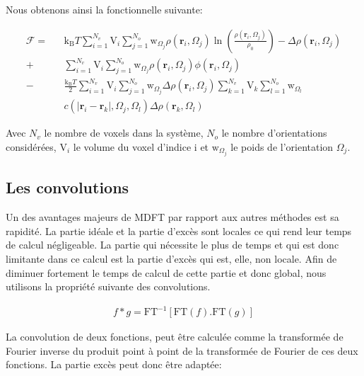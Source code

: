 Nous obtenons ainsi la fonctionnelle suivante:



\begin{eqnarray}
\mathcal{F} =& &\mathrm{k_B}T \sum\limits_{i=1}^{N_v}\mathrm{V}_i\sum\limits_{j=1}^{N_o}\mathrm{w}_{\Omega_j} \rho\left(\boldsymbol{r}_i,\Omega_j\right)\ln\left(\frac{\rho\left(\boldsymbol{r}_i,\Omega_j\right)}{\rho_0}\right)-\Delta\rho\left(\boldsymbol{r}_i,\Omega_j\right)\\
			+& &\sum\limits_{i=1}^{N_v}\mathrm{V}_i\sum\limits_{j=1}^{N_o}\mathrm{w}_{\Omega_j} \rho\left(\boldsymbol{r}_i,\Omega_j\right)\phi\left(\boldsymbol{r}_i,\Omega_j\right)\\
            -& &\frac{\mathrm{k_B}T}{2}\sum\limits_{i=1}^{N_v}\mathrm{V}_i\sum\limits_{j=1}^{N_o}\mathrm{w}_{\Omega_j} \Delta\rho\left(\boldsymbol{r}_i,\Omega_j\right) \sum\limits_{k=1}^{N_v}\mathrm{V}_k\sum\limits_{l=1}^{N_o} \mathrm{w}_{\Omega_l}\\
            & &c\left( \left|\boldsymbol{r}_i-\boldsymbol{r}_k\right|,\Omega_j,\Omega_l \right) \Delta\rho\left(\boldsymbol{r}_k,\Omega_l\right) \nonumber 
\end{eqnarray}


Avec $N_v$ le nombre de voxels dans la système, $N_o$ le nombre d'orientations considérées, $\mathrm{V}_i$ le volume du voxel d'indice i et $\mathrm{w}_{\Omega_j}$ le poids de l'orientation $\Omega_j$.


\subsection{Les convolutions}
Un des avantages majeurs de MDFT par rapport aux autres méthodes est sa rapidité. La partie idéale et la partie d'excès sont locales ce qui rend leur temps de calcul négligeable. La partie qui nécessite le plus de temps et qui est donc limitante dans ce calcul est la partie d'excès qui est, elle, non locale. Afin de diminuer fortement le temps de calcul de cette partie et donc global, nous utilisons la propriété suivante des convolutions.

\begin{eqnarray}
f*g = \mathrm{FT}^{-1} [ \mathrm{FT}(f) . \mathrm{FT}(g) ]
\end{eqnarray}

La convolution de deux fonctions, peut être calculée comme la transformée de Fourier inverse du produit point à point de la transformée de Fourier de ces deux fonctions. La partie excès peut donc être adaptée:


